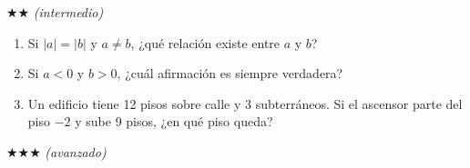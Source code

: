 \documentclass[11pt, letterpaper]{article}
\begin{document}
$\bigstar\bigstar$ \textit{(intermedio)}

\begin{enumerate}[label=\textbf{\arabic*.}, leftmargin=*, resume]
  \item Si $|a|=|b|$ y $a\neq b$, ¿qu\'e relaci\'on existe entre $a$ y $b$?

  \item
  \begin{minipage}[t]{\linewidth}
  Si $a<0$ y $b>0$, ¿cu\'al afirmaci\'on es siempre verdadera?
  \\%
  \begin{minipage}{\linewidth}
  \vspace{7mm}
  \end{minipage}
  \vspace{7mm}
  \end{minipage}

  \item Un edificio tiene 12 pisos sobre calle y 3 subterr\'aneos. Si el ascensor parte del piso $-2$ y sube 9 pisos, ¿en qu\'e piso queda?
  \vspace{2cm}
\end{enumerate}

$\bigstar\bigstar\bigstar$ \textit{(avanzado)}
\end{document}

